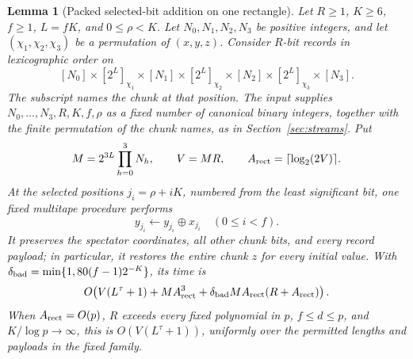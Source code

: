 \documentclass[11pt]{article}
\newtheorem{lemma}[theorem]{Lemma}
\theoremstyle{definition}
\begin{document}
\begin{lemma}[Packed selected-bit addition on one rectangle]
\label{lem:packed-selected-bit-rectangle}
Let $R\ge1$, $K\ge6$, $f\ge1$, $L=fK$, and $0\le\rho<K$.
Let $N_0,N_1,N_2,N_3$ be positive integers, and let
$(\chi_1,\chi_2,\chi_3)$ be a permutation of $(x,y,z)$.
Consider $R$-bit records in lexicographic order on
\[
 [N_0]\times[2^L]_{\chi_1}\times[N_1]\times[2^L]_{\chi_2}
 \times[N_2]\times[2^L]_{\chi_3}\times[N_3].
\]
The subscript names the chunk at that position. The input supplies
$N_0,\ldots,N_3,R,K,f,\rho$ as a fixed number of canonical binary
integers, together with the finite permutation of the chunk names, as
in Section~\ref{sec:streams}. Put
\[
 M=2^{3L}\prod_{h=0}^3N_h,\qquad V=MR,\qquad
 A_{\rm rect}=\lceil\log_2(2V)\rceil.
\]
At the selected positions $j_i=\rho+iK$, numbered from the least
significant bit, one fixed multitape procedure performs
\[
 y_{j_i}\longleftarrow y_{j_i}\mathbin\oplus x_{j_i}
 \quad(0\le i<f).
\]
It preserves the spectator coordinates, all other chunk bits, and every
record payload; in particular, it restores the entire chunk $z$ for
every initial value.
With $\delta_{\rm bad}=\min\{1,80(f-1)2^{-K}\}$, its time is
\begin{equation}
\label{eq:packed-rectangle-time}
 O\!\left(V(L^\tau+1)+MA_{\rm rect}^3+
       \delta_{\rm bad}MA_{\rm rect}(R+A_{\rm rect})\right).
\end{equation}
When $A_{\rm rect}=O(p)$, $R$ exceeds every fixed polynomial in $p$,
$f\le d\le p$, and $K/\log p\to\infty$, this is
$O(V(L^\tau+1))$, uniformly over the permitted lengths and payloads
in the fixed family.
\end{lemma}
\end{document}
